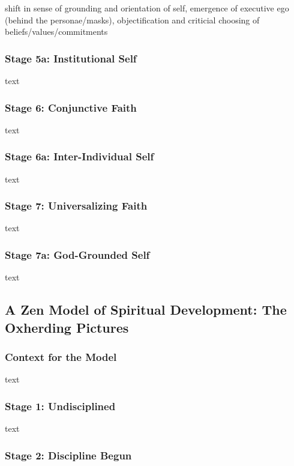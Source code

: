 shift in sense of grounding and orientation of self, emergence of executive ego (behind the personae/masks), objectification and criticial choosing of beliefs/values/commitments

\subsubsection{Stage 5a: Institutional Self}

text

\subsubsection{Stage 6: Conjunctive Faith}

text

\subsubsection{Stage 6a: Inter-Individual Self}

text

\subsubsection{Stage 7: Universalizing Faith}

text

\subsubsection{Stage 7a: God-Grounded Self}

text

\subsection{A Zen Model of Spiritual Development: The Oxherding Pictures}

\subsubsection{Context for the Model}

text

\subsubsection{Stage 1: Undisciplined}

text

\subsubsection{Stage 2: Discipline Begun}

